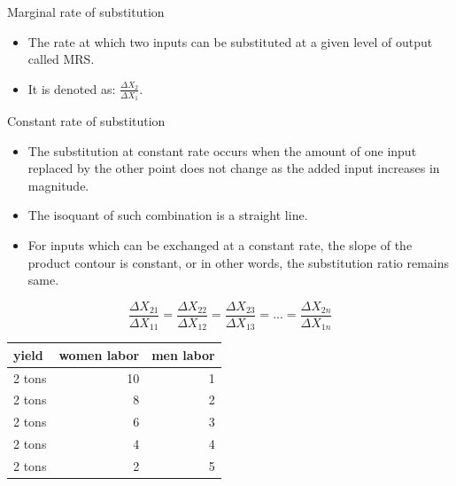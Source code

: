 \documentclass[12pt,ignorenonframetext,aspectratio=169]{beamer}
\providecommand{\tightlist}{%
  \setlength{\itemsep}{0pt}\setlength{\parskip}{0pt}}
\begin{document}
\begin{frame}{}
\protect\hypertarget{section-5}{}
\begin{block}{Marginal rate of substitution}
\protect\hypertarget{marginal-rate-of-substitution}{}
\begin{itemize}
\tightlist
\item
  The rate at which two inputs can be substituted at a given level of
  output called MRS.
\item
  It is denoted as: \(\frac{\Delta X_2}{\Delta X_1}\).
\end{itemize}
\end{block}
\end{frame}

\begin{frame}{Constant rate of substitution}
\protect\hypertarget{constant-rate-of-substitution}{}
\begin{itemize}
\tightlist
\item
  The substitution at constant rate occurs when the amount of one input
  replaced by the other point does not change as the added input
  increases in magnitude.
\item
  The isoquant of such combination is a straight line.
\item
  For inputs which can be exchanged at a constant rate, the slope of the
  product contour is constant, or in other words, the substitution ratio
  remains same.
\end{itemize}

\[
\frac{\Delta X_{21}}{\Delta X_{11}} = \frac{\Delta X_{22}}{\Delta X_{12}} = \frac{\Delta X_{23}}{\Delta X_{13}} = ... = \frac{\Delta X_{2n}}{\Delta X_{1n}}
\]
\end{frame}

\begin{frame}{}
\protect\hypertarget{section-6}{}
\begin{table}[H]
\centering
\begin{tabular}{lrr}
\toprule
yield & women labor & men labor\\
\midrule
\rowcolor{gray!6}  2 tons & 10 & 1\\
2 tons & 8 & 2\\
\rowcolor{gray!6}  2 tons & 6 & 3\\
2 tons & 4 & 4\\
\rowcolor{gray!6}  2 tons & 2 & 5\\
\bottomrule
\end{tabular}
\end{table}
\end{frame}
\end{document}
